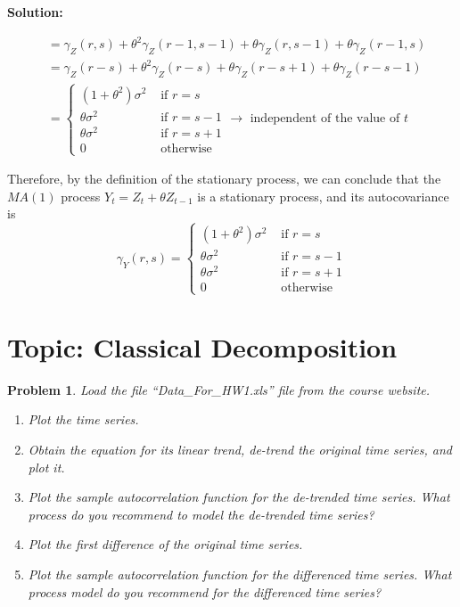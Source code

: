 \documentclass[11pt]{article}
\theoremstyle{plain} %
\newtheorem{problem}[theorem]{Problem}
\newenvironment{solution}
{\color{C2}\normalfont\begin{framed}\begingroup\textbf{Solution:} }
  {\endgroup\end{framed}}
\theoremstyle{remark}
\begin{document}
\begin{solution}
\begin{enumerate}[label=(\roman*)]
{\begin{align*}
			                      & = \gamma_{Z}(r, s) + \theta^{2}\gamma_{Z}(r-1, s-1) + \theta\gamma_{Z}(r, s-1) + \theta\gamma_{Z}(r-1, s)                                 \\
			                      & = \gamma_{Z}(r-s) + \theta^{2}\gamma_{Z}(r-s) + \theta\gamma_{Z}(r-s+1)+ \theta\gamma_{Z}(r-s-1)                                          \\
			                      & = \begin{cases}
				                          (1 + \theta^{2})\sigma^{2} & \text{ if } r = s   \\
				                          \theta\sigma^{2}           & \text{ if } r = s-1 \\
				                          \theta\sigma^{2}           & \text{ if } r = s+1 \\
				                          0                          & \text{ otherwise }
			                          \end{cases}  \longrightarrow \text{ independent of the value of } t
		      \end{align*}
		      }\end{enumerate}
	Therefore, by the definition of the stationary process, we can conclude that the $MA(1)$ process $Y_{t} = Z_{t} + \theta Z_{t-1}$ is a stationary process, and its autocovariance is
	$$
		\gamma_{Y}(r,s) = \begin{cases}
			(1 + \theta^{2})\sigma^{2} & \text{ if } r = s   \\
			\theta\sigma^{2}           & \text{ if } r = s-1 \\
			\theta\sigma^{2}           & \text{ if } r = s+1 \\
			0                          & \text{ otherwise }
		\end{cases}
	$$
\end{solution}

\section{Topic: Classical Decomposition}
\begin{problem}
Load the file ``Data\_For\_HW1.xls'' file from the course website.
\begin{enumerate}[label = (\alph*)]
	\item Plot the time series.
	\item Obtain the equation for its linear trend, de-trend the original time series, and plot it.
	\item Plot the sample autocorrelation function for the de-trended time series. What process do you recommend to model the de-trended time series?
	\item Plot the first difference of the original time series.
	\item Plot the sample autocorrelation function for the differenced time series. What process model do you recommend for the differenced time series?
\end{enumerate}

\end{problem}
\end{document}
